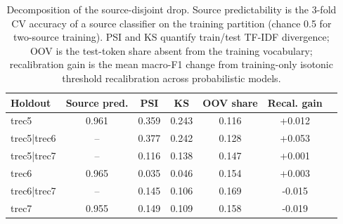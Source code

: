 
\begin{table}[!htbp]
\centering
\caption{Decomposition of the source-disjoint drop. Source predictability is the 3-fold CV accuracy of a source classifier on the training partition (chance 0.5 for two-source training). PSI and KS quantify train/test TF-IDF divergence; OOV is the test-token share absent from the training vocabulary; recalibration gain is the mean macro-F1 change from training-only isotonic threshold recalibration across probabilistic models.}
\label{tab:decomposition}
\begin{tabular}{lcccccc}
\hline\hline
Holdout & Source pred. & PSI & KS & OOV share & Recal. gain \\
\hline
trec5 & 0.961 & 0.359 & 0.243 & 0.116 & +0.012 \\
trec5|trec6 & -- & 0.377 & 0.242 & 0.128 & +0.053 \\
trec5|trec7 & -- & 0.116 & 0.138 & 0.147 & +0.001 \\
trec6 & 0.965 & 0.035 & 0.046 & 0.154 & +0.003 \\
trec6|trec7 & -- & 0.145 & 0.106 & 0.169 & -0.015 \\
trec7 & 0.955 & 0.149 & 0.109 & 0.158 & -0.019 \\
\hline\hline
\end{tabular}
\end{table}
